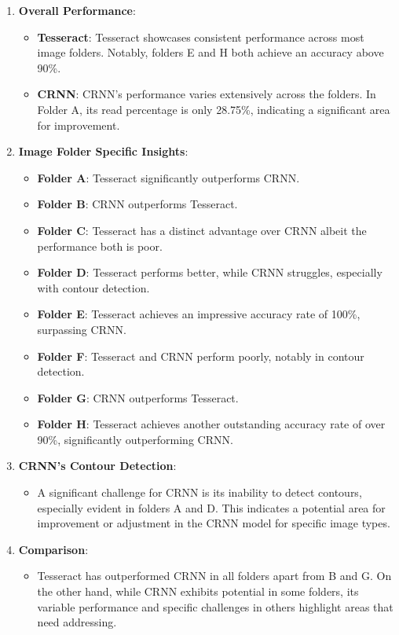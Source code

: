 \begin{enumerate}
    \item \textbf{Overall Performance}:
          \begin{itemize}
              \item \textbf{Tesseract}: Tesseract showcases consistent performance across most image folders. Notably, folders E and H both achieve an accuracy above 90\%.
              \item \textbf{CRNN}: CRNN's performance varies extensively across the folders. In Folder A, its read percentage is only 28.75\%, indicating a significant area for improvement.
          \end{itemize}

    \item \textbf{Image Folder Specific Insights}:
          \begin{itemize}
              \item \textbf{Folder A}: Tesseract significantly outperforms CRNN.
              \item \textbf{Folder B}: CRNN outperforms Tesseract.
              \item \textbf{Folder C}: Tesseract has a distinct advantage over CRNN albeit the performance both is poor.
              \item \textbf{Folder D}: Tesseract performs better, while CRNN struggles, especially with contour detection.
              \item \textbf{Folder E}: Tesseract achieves an impressive accuracy rate of 100\%, surpassing CRNN.
              \item \textbf{Folder F}: Tesseract and CRNN perform poorly, notably in contour detection.
              \item \textbf{Folder G}: CRNN outperforms Tesseract.
              \item \textbf{Folder H}: Tesseract achieves another outstanding accuracy rate of over 90\%, significantly outperforming CRNN.
          \end{itemize}

    \item \textbf{CRNN's Contour Detection}:
          \begin{itemize}
              \item A significant challenge for CRNN is its inability to detect contours, especially evident in folders A and D. This indicates a potential area for improvement or adjustment in the CRNN model for specific image types.
          \end{itemize}

    \item \textbf{Comparison}:
          \begin{itemize}
              \item Tesseract has outperformed CRNN in all folders apart from B and G. On the other hand, while CRNN exhibits potential in some folders, its variable performance and specific challenges in others highlight areas that need addressing.
          \end{itemize}

\end{enumerate}

